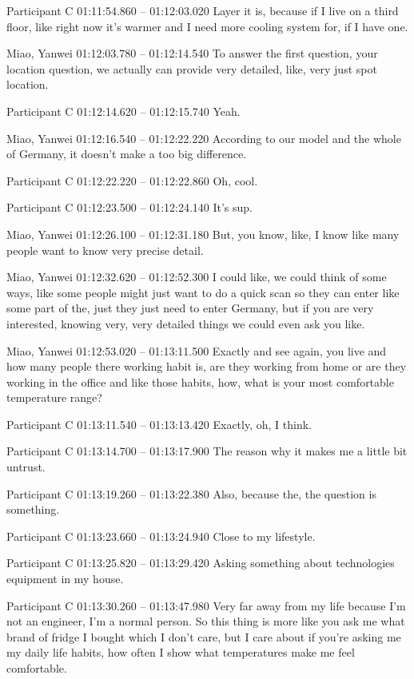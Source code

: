 {Participant C 01:11:54.860 -- 01:12:03.020
Layer it is, because if I live on a third floor, like right now it's warmer and I need more cooling system for, if I have one.

Miao, Yanwei 01:12:03.780 -- 01:12:14.540
To answer the first question, your location question, we actually can provide very detailed, like, very just spot location.

Participant C 01:12:14.620 -- 01:12:15.740
Yeah.

Miao, Yanwei 01:12:16.540 -- 01:12:22.220
According to our model and the whole of Germany, it doesn't make a too big difference.

Participant C 01:12:22.220 -- 01:12:22.860
Oh, cool.

Participant C 01:12:23.500 -- 01:12:24.140
It's sup.

Miao, Yanwei 01:12:26.100 -- 01:12:31.180
But, you know, like, I know like many people want to know very precise detail.

Miao, Yanwei 01:12:32.620 -- 01:12:52.300
I could like, we could think of some ways, like some people might just want to do a quick scan so they can enter like some part of the, just they just need to enter Germany, but if you are very interested, knowing very, very detailed things we could even ask you like.

Miao, Yanwei 01:12:53.020 -- 01:13:11.500
Exactly and see again, you live and how many people there working habit is, are they working from home or are they working in the office and like those habits, how, what is your most comfortable temperature range?

Participant C 01:13:11.540 -- 01:13:13.420
Exactly, oh, I think.

Participant C 01:13:14.700 -- 01:13:17.900
The reason why it makes me a little bit untrust.

Participant C 01:13:19.260 -- 01:13:22.380
Also, because the, the question is something.

Participant C 01:13:23.660 -- 01:13:24.940
Close to my lifestyle.

Participant C 01:13:25.820 -- 01:13:29.420
Asking something about technologies equipment in my house.

Participant C 01:13:30.260 -- 01:13:47.980
Very far away from my life because I'm not an engineer, I'm a normal person. So this thing is more like you ask me what brand of fridge I bought which I don't care, but I care about if you're asking me my daily life habits, how often I show what temperatures make me feel comfortable.

}
